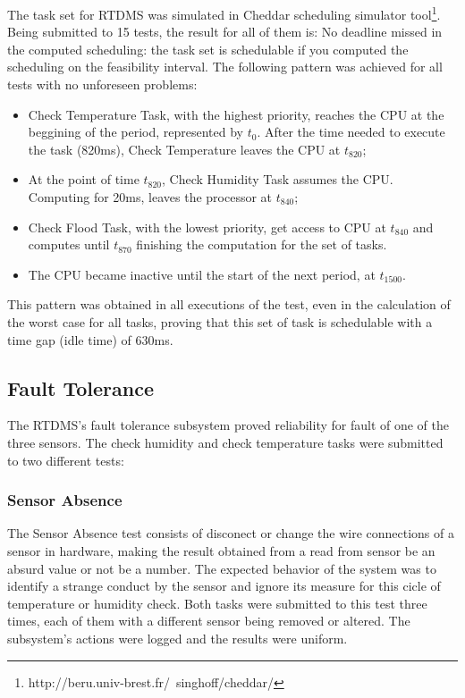 \documentclass[12pt]{article}
\begin{document}
The task set for RTDMS was simulated in Cheddar scheduling simulator tool\footnote{http://beru.univ-brest.fr/~singhoff/cheddar/}.
Being submitted to 15 tests, the result for all of them is: No deadline missed in the computed scheduling: the task set is 
schedulable if you computed the scheduling on the feasibility interval. The following pattern was achieved for all tests with 
no unforeseen problems:
\begin{itemize}
 \item Check Temperature Task, with the highest priority, reaches the CPU at the beggining of the period, represented by
\(t_0\). After the time needed to execute the task (820ms), Check Temperature leaves the CPU at \(t_{820}\);
 \item At the point of time \(t_{820}\), Check Humidity Task assumes the CPU. Computing for 20ms, leaves the processor at 
\(t_{840}\);
 \item Check Flood Task, with the lowest priority, get access to CPU at \(t_{840}\) and computes until \(t_{870}\) finishing
the computation for the set of tasks.
 \item The CPU became inactive until the start of the next period, at \(t_{1500}\).
\end{itemize}

This pattern was obtained in all executions of the test, even in the calculation of the worst case for all tasks, proving
that this set of task is schedulable with a time gap (idle time) of 630ms.

\subsection{Fault Tolerance}
The RTDMS's fault tolerance subsystem proved reliability for fault of one of the three sensors. The check humidity and check
temperature tasks were submitted to two different tests:

\subsubsection{Sensor Absence}
The Sensor Absence test consists of disconect or change the wire connections of a sensor in hardware, making the result
obtained from a read from sensor be an absurd value or not be a number. The expected behavior of the system was to identify
a strange conduct by the sensor and ignore its measure for this cicle of temperature or humidity check. Both tasks were 
submitted to this test three times, each of them with a different sensor being removed or altered. The subsystem's actions 
were logged and the results were uniform.
\end{document}
